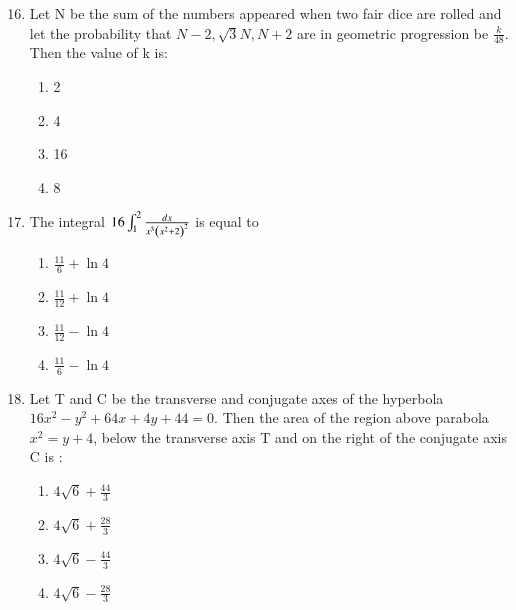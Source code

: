 \documentclass[journal]{IEEEtran}
\begin{document}
\begin{enumerate}
\setcounter{enumi}{15}
 
    \item Let N be the sum of the numbers appeared when two fair dice are rolled and let the probability that $N-2,\sqrt{3}N,N+2$ are in geometric progression be $\frac{k}{48}$. Then the value of k is:
        \begin{multicols}{1}
            \begin{enumerate}
                \item 2
                \item 4
                \item 16
                \item 8
            \end{enumerate}
        \end{multicols}

    \item The integral $16\int_{1}^{2} \frac{dx}{x^3\left(x^2+2\right)^2}$ is equal  to 

		\begin{multicols}{4}
			\begin{enumerate}
				\item $\frac{11}{6}+\ln{4}$
				\item  $\frac{11}{12}+\ln{4}$
				\item  $\frac{11}{12}-\ln{4}$
				\item  $\frac{11}{6}-\ln{4}$
			\end{enumerate}
		\end{multicols}

    \item Let T and C be  the transverse and conjugate axes of the hyperbola $16x^2-y^2+64x+4y+44=0.$ Then the area of the region above parabola $x^2=y+4$, below the transverse axis T and on the right of the conjugate axis C is :
        \begin{multicols}{4}
            \begin{enumerate}
               \item $4\sqrt{6}+\frac{44}{3}$
               \item $4\sqrt{6}+\frac{28}{3}$
               \item $4\sqrt{6}-\frac{44}{3}$
               \item $4\sqrt{6}-\frac{28}{3}$
            \end{enumerate}
        \end{multicols}


\end{enumerate}
\end{document}
